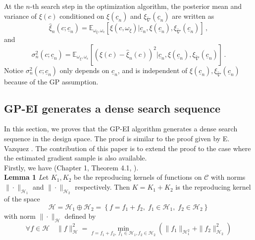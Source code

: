 \documentclass[a4paper,onecolumn]{article}
\theoremstyle{remark}
\begin{document}
At the $n$-th search step in the optimization algorithm, 
the posterior mean and variance of $\xi(c)$ conditioned on 
$\xi(\underline{c}_n)$ and $\xi_{\tilde{\nabla}}(\underline{c}_n)$ are written as
\begin{equation} 
    \hat{\xi}_n(c; \underline{c}_n) 
    = \mathbb{E}_{\omega_\xi, \omega_\epsilon}\left[ \xi(c, \omega_\xi) \Big|
                          \underline{c}_n, \xi(\underline{c}_n), 
                          \xi_{\tilde{\nabla}}(\underline{c}_n) \right]\,,
    \label{cond expectation}
\end{equation}
and
\begin{equation}
    \sigma_n^2(c;\underline{c}_n) = \mathbb{E}_{\omega_\xi, \omega_\epsilon}\left[\left(
        \xi(c) - \hat{\xi}_n(c)\right)^2 \Big| \underline{c}_n,
        \xi(\underline{c}_n), \xi_{\tilde{\nabla}}(\underline{c}_n)
        \right]\,.
\end{equation}
Notice $\sigma_n^2(c;\underline{c}_n)$ only depends on $\underline{c}_n$, and is independent 
of $\xi(\underline{c}_n), \xi_{\tilde{\nabla}}(\underline{c}_n)$ because of the GP 
assumption.



\subsection{GP-EI generates a dense search sequence}
In this section, we proves that the GP-EI algorithm generates a dense search sequence 
in the design space. The proof is similar to the proof given by E. Vazquez \cite{convergen EI}.
The contribution of this paper is to extend the proof to the case where
the estimated gradient sample is also available.\\

Firstly, we have (Chapter 1, Theorem 4.1, \cite{RKHS book}).\\
{\textbf{Lemma 1}}
{\emph
    Let $K_1, K_2$ be the reproducing kernels of functions on $\mathcal{C}$ with
    norms $\|\cdot\|_{\mathcal{H}_1}$ and $\|\cdot\|_{\mathcal{H}_2}$ respectively. Then $K=K_1+K_2$ is
    the reproducing kernel of the space 
    $$
        \mathcal{H} = \mathcal{H}_1\oplus \mathcal{H}_2 =
        \left\{ 
            f = f_1 + f_2, \; f_1\in \mathcal{H}_1, \; f_2\in\mathcal{H}_2
        \right\}
    $$
    with norm $\|\cdot\|_\mathcal{H}$ defined by 
    $$
        \forall f\in \mathcal{H} \quad \|f\|_{\mathcal{H}}^2 
        = \min_{
                f=f_1+f_2,\; 
                f_1\in \mathcal{H}_1, f_2\in \mathcal{H}_2
        }
        \left(\|f_1\|_{\mathcal{H}_1^2} + \|f_2\|_{\mathcal{H}_2}^2\right)
    $$
}
\end{document}
